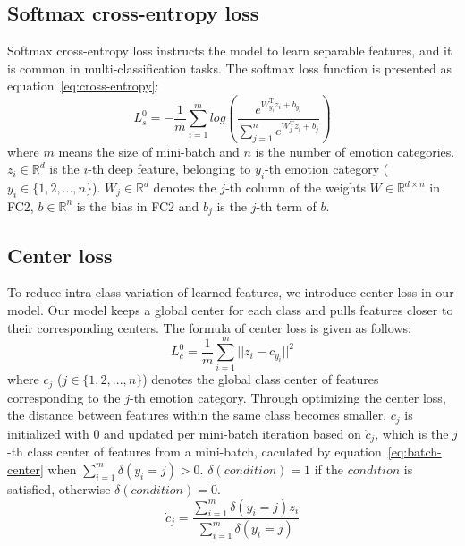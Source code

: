 \documentclass{article}
\begin{document}
\subsection{Softmax cross-entropy loss}
\label{ssec:cross-entropy}

Softmax cross-entropy loss instructs the model to learn separable features, and it is common in multi-classification tasks. The softmax loss function is presented as equation~\ref{eq:cross-entropy}:
\begin{equation} \label{eq:cross-entropy}
L_s^0 = - \frac{1}{m}\sum_{i=1}^{m}{log(\frac{e^{W_{y_i}^\mathrm{T}z_i+b_{y_i}}}{\sum_{j=1}^{n}e^{W_j^\mathrm{T}z_i+b_j}})}
\end{equation}
where $m$ means the size of mini-batch and $n$ is the number of emotion categories. $z_i \in \mathbb{R}^d$ is the $i$-th deep feature, belonging to $y_i$-th emotion category ($y_i \in  \{1, 2, ... , n\}$). $W_j \in \mathbb{R}^d$ denotes the $j$-th column of the weights $ W \in \mathbb{R}^{d \times n} $ in FC2, $b \in \mathbb{R} ^ n $ is the bias in FC2 and $ b_j $ is the $j$-th term of $b$.

\subsection{Center loss}
To reduce intra-class variation of learned features, we introduce center loss in our model. Our model keeps a global center for each class and pulls features closer to their corresponding centers. The formula of center loss is given as follows:
\begin{equation} \label{eq:center-loss}
L_c^0=\frac{1}{m}\sum_{i=1}^{m}||z_i - c_{y_i}||^2
\end{equation}
where $c_j$ ($j \in \{1, 2, ... , n\}$) denotes the global class center of features corresponding to the $j$-th emotion category. Through optimizing the center loss, the distance between features within the same class becomes smaller. $c_j$ is initialized with 0 and updated per mini-batch iteration based on $\dot{c}_j$, which is the $j$-th class center of features from a mini-batch, caculated by equation~\ref{eq:batch-center} when $\sum_{i=1}^{m}\delta(y_i = j) > 0$. $\delta(condition) = 1$ if the $condition$ is satisfied, otherwise $\delta(condition) = 0$.
\begin{equation} \label{eq:batch-center}
\dot{c}_j = \frac{\sum_{i=1}^{m}\delta(y_i = j) z_i}{\sum_{i=1}^{m}\delta(y_i = j)}
\end{equation}
\end{document}
